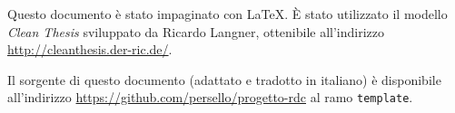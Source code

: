 %
\pagestyle{empty}
\hfill
\vfill

Questo documento è stato impaginato con \LaTeX.
È stato utilizzato il modello \textit{Clean Thesis} sviluppato da Ricardo Langner, ottenibile all'indirizzo \url{http://cleanthesis.der-ric.de/}.


Il sorgente di questo documento (adattato e tradotto in italiano) è disponibile all'indirizzo \url{https://github.com/persello/progetto-rdc} al ramo \texttt{template}.
